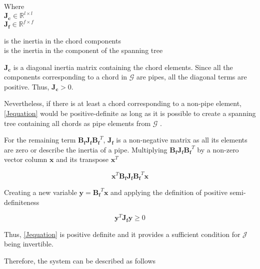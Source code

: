 \begin{minipage}[t]{0.20\textwidth}
Where\\
\hspace*{8mm} $\pmb{J_c} \in \mathbb{R}^{l \times l}$  \\
\hspace*{8mm} $\pmb{J_f} \in \mathbb{R}^{f \times f} $ 
\end{minipage}
\begin{minipage}[t]{0.68\textwidth}
\vspace*{2mm}
\hspace*{4mm} is the inertia in the chord components\\
\hspace*{4mm} is the inertia in the component of the spanning tree 
\end{minipage}

$\pmb{J_c}$ is a diagonal inertia matrix containing the chord elements. Since all the components corresponding to a chord in $\pmb{\mathcal{G}}$ are pipes, all the 
diagonal terms are positive. Thus, $\pmb{J_c} > 0$. 

Nevertheless, if there is at least a chord corresponding to a non-pipe element, \eqref{Jequation} 
would be positive-definite as long as it is possible to create a spanning tree containing all chords as pipe elements from $\pmb{\mathcal{G}}$ \cite{TowerModel}.

For the remaining term $\pmb{B_f J_f {B_f}}^T$, $\pmb{J_f}$ is a non-negative matrix as all its elements are zero or describe the inertia of a pipe. 
Multiplying $\pmb{B_f J_f {B_f}}^T$ by a non-zero vector column $\mathbf{x}$ and its transpose $\mathbf{x}^{T}$

\begin{equation}
  \pmb{x}^{T} \pmb{B_f J_f {B_f}}^T \pmb{x}
  \label{PosDefi}
\end{equation}

Creating a new variable $\pmb{y} = \pmb{B_f}^T \mathbf{x}$ and applying the definition of positive semi-definiteness 
\cite{MatrixBook}

\begin{equation}
  \pmb{y}^{T} \pmb{J_f y} \geqslant 0
  \label{PosDefEq}
\end{equation}

Thus, \eqref{Jequation} is positive definite and it provides a sufficient condition for $\pmb{\mathcal{J}}$ being invertible. 

Therefore, the system can be described as follows

